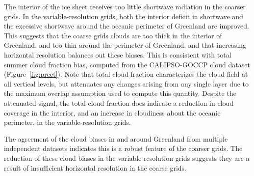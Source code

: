 \documentclass[draft]{agujournal2019}
\begin{document}
The interior of the ice sheet receives too little shortwave radiation in the coarser grids. In the variable-resolution grids, both the interior deficit in shortwave and the excessive shortwave around the oceanic perimeter of Greenland are improved. This suggests that the coarse grids clouds are too thick in the interior of Greenland, and too thin around the perimeter of Greenland, and that increasing horizontal resolution balances out these biases. This is consistent with total summer cloud fraction bias, computed from the CALIPSO-GOCCP cloud dataset (Figure~\ref{fig:prect}). Note that total cloud fraction characterizes the cloud field at all vertical levels, but attenuates any changes arising from any single layer due to the maximum overlap assumption used to compute this quantity. Despite the attenuated signal, the total cloud fraction does indicate a reduction in cloud coverage in the interior, and an increase in cloudiness about the oceanic perimeter, in the variable-resolution grids. 

The agreement of the cloud biases in and around Greenland from multiple independent datasets indicates this is a robust feature of the coarser grids. The reduction of these cloud biases in the variable-resolution grids suggests they are a result of insufficient horizontal resolution in the coarse grids.
\end{document}

